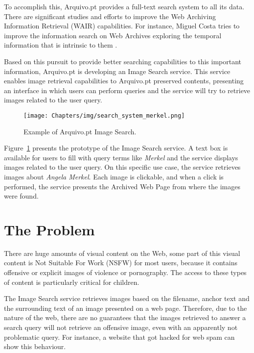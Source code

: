 To accomplish this, Arquivo.pt provides a full-text search system to all its data. 
There are significant studies and efforts to improve the Web Archiving Information Retrieval (WAIR) capabilities. For instance, Miguel Costa tries to improve the information search on Web Archives exploring the temporal information that is intrinsic to them \cite{Costa:InformationSearchIn:2014}.

Based on this pursuit to provide better searching capabilities to this important information, Arquivo.pt is developing an Image Search service. This service enables image retrieval capabilities to Arquivo.pt preserved contents, presenting an interface in which users can perform queries and the service will try to retrieve images related to the user query.

\begin{figure}[!b] 
    \centering
    \texttt{[image: Chapters/img/search\_system\_merkel.png]}
    \caption{Example of Arquivo.pt Image Search.}
    \label{fig:image_search}
\end{figure}

Figure~\ref{fig:image_search} presents the prototype of the Image Search service. A text box is available for users to fill with query terms like \emph{Merkel} and the service displays images related to the user query. On this specific use case, the service retrieves images about \emph{Angela Merkel}. Each image is clickable, and when a click is performed, the service presents the Archived Web Page from where the images were found.

\section{The Problem}

There are huge amounts of visual content on the Web, some part of this visual content is Not Suitable For Work (NSFW) for most users, because it contains offensive or explicit images of violence or pornography. The access to these types of content is particularly critical for children.

The Image Search service retrieves images based on the filename, anchor text and the surrounding text of an image presented on a web page. Therefore, due to the nature of the web, there are no guarantees that the images retrieved to answer a search query will not retrieve an offensive image, even with an apparently not problematic query. For instance, a website that got hacked for web spam can show this behaviour.

